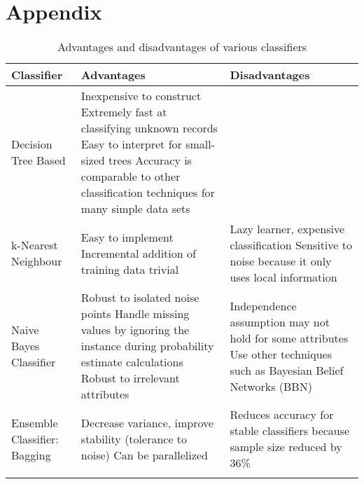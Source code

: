 \chapter{Appendix}

\begin{longtable}{ | P{3cm} | P{5cm} | P{5cm} | } 
    \hline
    \textbf{Classifier} & \textbf{Advantages} & \textbf{Disadvantages} \\ \hline
    Decision Tree Based & 
        Inexpensive to construct\newline \newline
        Extremely fast at classifying unknown records\newline \newline
        Easy to interpret for small-sized trees\newline \newline
        Accuracy is comparable to other classification techniques for many simple data sets \newline
    & \\ \hline
    k-Nearest Neighbour & 
        Easy to implement\newline \newline
        Incremental addition of training data trivial\newline
    & 
        Lazy learner, expensive classification \newline \newline
        Sensitive to noise because it only uses local information
    \\ \hline
    Naive Bayes Classifier &
        Robust to isolated noise points \newline \newline
        Handle missing values by ignoring the instance during probability estimate calculations \newline \newline
        Robust to irrelevant attributes \newline
    &
        Independence assumption may not hold for some attributes \newline \newline
        Use other techniques such as Bayesian Belief Networks (BBN) \newline
    \\ \hline
    Ensemble Classifier: Bagging &
        Decrease variance, improve stability (tolerance to noise) \newline \newline
        Can be parallelized \newline
    &
        Reduces accuracy for stable classifiers because sample size reduced by 36\% \newline
    \\ \hline

\caption{Advantages and disadvantages of various classifiers}
\label{table:1}
\end{longtable}

